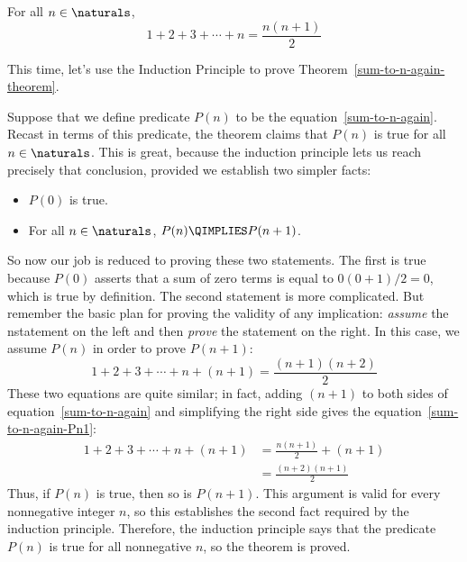 \begin{theorem}\label{sum-to-n-again-theorem}
For all $n \in \naturals$,
\begin{equation}\label{sum-to-n-again}
1 + 2 + 3 + \cdots + n = \frac{n(n+1)}{2}
\end{equation}
\end{theorem}

This time, let's use the Induction Principle to prove
Theorem~\ref{sum-to-n-again-theorem}.

Suppose that we define predicate $P(n)$ to be the
equation~\eqref{sum-to-n-again}.  Recast in terms of this predicate, the
theorem claims that $P(n)$ is true for all $n \in \naturals$.  This is
great, because the induction principle lets us reach precisely that
conclusion, provided we establish two simpler facts:
%
\begin{itemize}
\item $P(0)$ is true.
\item For all $n \in \naturals$, $P(n) \QIMPLIES P(n+1)$.
\end{itemize}

So now our job is reduced to proving these two statements.  The first
is true because $P(0)$ asserts that a sum of zero terms is equal to
$0(0+1)/2 = 0$, which is true by definition.
%
The second statement is more complicated.  But remember the basic plan for
proving the validity of any implication: \textit{assume} the nstatement on
the left and then \textit{prove} the statement on the right.  In this
case, we assume $P(n)$ in order to prove $P(n+1)$:
\begin{equation}\label{sum-to-n-again-Pn1}
1 + 2 + 3 + \cdots + n + (n+1) = \frac{(n+1)(n+2)}{2}
\end{equation}
These two equations are quite similar; in fact, adding $(n+1)$ to both
sides of equation~\eqref{sum-to-n-again} and simplifying the right side 
gives the equation~\eqref{sum-to-n-again-Pn1}:
\begin{align*}
1 + 2 + 3 + \cdots + n + (n+1)
    & = \frac{n(n+1)}{2} + (n+1) \\
    & = \frac{(n+2)(n+1)}{2}
\end{align*}
Thus, if $P(n)$ is true, then so is $P(n+1)$.  This argument is valid
for every nonnegative integer $n$, so this establishes the second fact
required by the induction principle.  Therefore, the induction principle
says that the predicate $P(n)$ is true for all nonnegative $n$, so the 
theorem is proved.

\iffalse
In effect, we've just proved
that $P(0)$ implies $P(1)$, $P(1)$ implies $P(2)$, $P(2)$ implies
$P(3)$, etc., all in one fell swoop.
\fi

